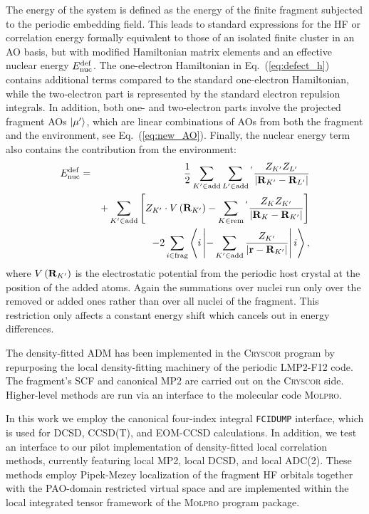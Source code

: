 \documentclass[aip,jcp,reprint]{revtex4-2}
\begin{document}
The energy of the system is defined as the energy of the finite fragment subjected to the periodic embedding field. This leads to standard expressions for the HF or correlation energy formally equivalent to those of an isolated finite cluster in an AO basis, but with modified Hamiltonian matrix elements and an effective nuclear energy $E^{\rm def}_{\rm nuc}$. The one-electron Hamiltonian in Eq.~(\ref{eq:defect_h}) contains additional terms compared to the standard one-electron Hamiltonian, while the two-electron part is represented by the standard electron repulsion integrals. In addition, both one- and two-electron parts involve the projected fragment AOs $\ket{\mu'}$, which are linear combinations of AOs from both the fragment and the environment, see Eq.~(\ref{eq:new_AO}). Finally, the nuclear energy term also contains the contribution from the environment:
\begin{eqnarray}
  E^{\rm def}_{\rm nuc}&=&{1 \over 2}\sum_{K'\in{\rm add}}\sum_{L'\in{\rm add}}\phantom{}^{'}{Z_{K'}Z_{L'} \over |{\bf R}_{K'}-{\bf
      R}_{L'}|}\nonumber\\
  &&+\sum_{K'\in{\rm add}}\left[ Z_{K'}\cdot V\left({\bf
                          R}_{K'}\right) -\sum_{K\in{\rm rem}}\phantom{}^{'}{Z_{K}Z_{K'} \over |{\bf R}_{K}-{\bf R}_{K'}|}\right]\nonumber\\
  &&-2\sum_{i\in{\rm frag}}\left< i\left|-\sum_{K'\in{\rm add}}{Z_{K'} \over |{\bf r}-{\bf  R}_{K'}|}\right|i\right>,\label{eq:E_nuc_defect}
  \end{eqnarray}
where $V\left({\bf R}_{K'}\right)$ is the electrostatic potential from the periodic host crystal at the position of the added atoms. 
Again the summations over nuclei run only over the removed or added ones rather than over all nuclei of the fragment. This restriction only affects a constant energy shift which cancels out in energy differences.\cite{Lavroff2025_JCP_ADM}

The density-fitted ADM has been implemented in the \textsc{Cryscor} program\cite{CRYSCOR} by repurposing the local density-fitting machinery of the periodic LMP2-F12 code.\cite{Usvyat2013_F12} The fragment's SCF and canonical MP2 are carried out on the \textsc{Cryscor} side. Higher-level methods are run via an interface to the molecular code \textsc{Molpro}.\cite{Molpro2020}

In this work we employ the canonical four-index integral \texttt{FCIDUMP} interface,\cite{Knowles1989_FCIDUMP} which is used for DCSD,\cite{..} CCSD(T),\cite{..} and EOM-CCSD\cite{..} calculations. In addition, we test an interface to our pilot implementation of density-fitted local correlation methods,\cite{your_local_corr_ref} currently featuring local MP2, local DCSD, and local ADC(2)\cite{..}. These methods employ Pipek-Mezey localization\cite{Pipek1989} of the fragment HF orbitals together with the PAO-domain restricted virtual space and are implemented within the local integrated tensor framework\cite{Kats_LITF} of the \textsc{Molpro} program package.
\end{document}
